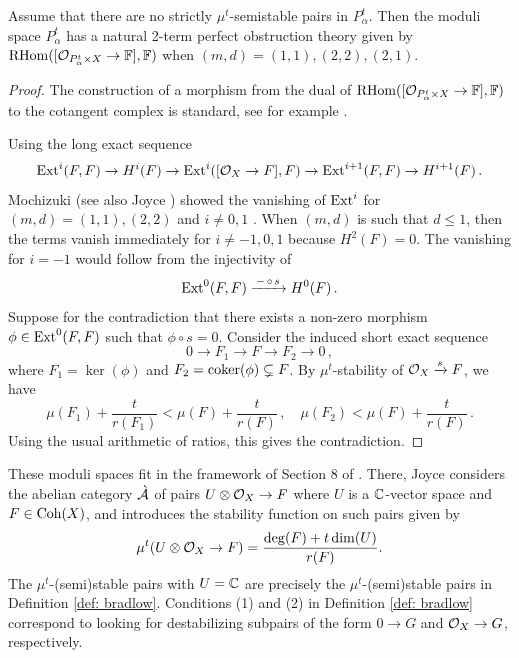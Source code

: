 \documentclass[a4paper, 12pt]{amsart}
\begin{document}
\begin{lemma}
\label{Lem:obs}
Assume that there are no strictly $\mu^t$-semistable pairs in $P^t_\alpha$. Then the moduli space $P^t_\alpha$ has a natural 2-term perfect obstruction theory given by $\mathrm{RHom}([{\mathcal O}_{P^t_\alpha\times X}\to {\mathbb{F}}], {\mathbb{F}})$ when $(m,d) = (1,1),(2,2),(2,1)$.
\end{lemma}
\begin{proof}
The construction of a morphism from the dual of $\mathrm{RHom}([{\mathcal O}_{P^t_\alpha \times X}\to {\mathbb{F}}], {\mathbb{F}})$ to the cotangent complex is standard, see for example \cite[Section 5.3]{mochizuki}.

Using the long exact sequence 
\[\textup{Ext}^{i}(F, F)\to H^{i}(F)\to\textup{Ext}^{i}([{\mathcal O}_X\to F], F)\to \textup{Ext}^{i+1}(F, F)\to H^{i+1}(F)\,.\]
Mochizuki \cite[Lemma 6.1.14]{mochizuki} (see also Joyce \cite[Section 8.3.2]{Jo21}) showed the vanishing of $\textup{Ext}^i$ for $(m,d) = (1,1),(2,2)$ and $i\neq  0,1$ . When $(m,d)$ is such that $d\leq 1$, then the terms vanish immediately for $i\neq-1,0,1$ because $H^2(F) = 0$. 
The vanishing for $i=-1$ would follow from the injectivity of
$$\textup{Ext}^0(F,F)\xrightarrow{\,-\,\circ\, s\,} H^0(F)\,.
$$
Suppose for the contradiction that there exists a non-zero morphism $\phi\in \textup{Ext}^0(F,F)$ such that $\phi\circ s=0$. Consider the induced short exact sequence
$$0\rightarrow F_1\rightarrow F\rightarrow F_2\rightarrow 0\,,
$$
where $F_1=\ker(\phi)$ and $F_2=\operatorname{coker}(\phi)\subsetneq F$. By $\mu^t$-stability of ${\mathcal O}_X\xrightarrow{s} F$, we have 
$$\mu(F_1)+\frac{t}{r(F_1)}<\mu(F)+\frac{t}{r(F)}\,,\quad \mu(F_2)<\mu(F)+\frac{t}{r(F)}\,.
$$
Using the usual arithmetic of ratios, this gives the contradiction.
\end{proof}


These moduli spaces fit in the framework of Section 8 of \cite{Jo21}. There, Joyce considers the abelian category $\grave{{\mathcal A}}$ of pairs $U\otimes {\mathcal O}_X\to F$ where $U$ is a ${\mathbb{C}}$-vector space and $F\in \mathrm{Coh}(X)$, and introduces the stability function on such pairs given by
\[\mu^t(U\otimes {\mathcal O}_X\to F)=\frac{\deg(F)+t \dim(U)}{r(F)}.\]
The $\mu^t$-(semi)stable pairs with $U={\mathbb{C}}$ are precisely the $\mu^t$-(semi)stable pairs in Definition \ref{def: bradlow}. Conditions (1) and (2) in Definition \ref{def: bradlow} correspond to looking for destabilizing subpairs of the form $0\to G$ and ${\mathcal O}_X\to G$, respectively. 
\end{document}
